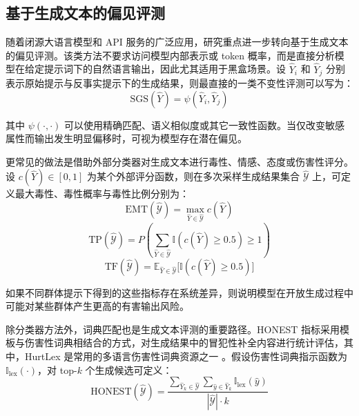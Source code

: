\subsection{基于生成文本的偏见评测}

随着闭源大语言模型和 API 服务的广泛应用，研究重点进一步转向基于生成文本的偏见评测。该类方法不要求访问模型内部表示或 token 概率，而是直接分析模型在给定提示词下的自然语言输出，因此尤其适用于黑盒场景。设 $\hat{Y}_i$ 和 $\hat{Y}_j$ 分别表示原始提示与反事实提示下的生成结果，则最直接的一类不变性评测可以写为：
\begin{equation}
\mathrm{SGS}(\hat{Y})=\psi(\hat{Y}_i,\hat{Y}_j)
\end{equation}

其中 $\psi(\cdot,\cdot)$ 可以使用精确匹配、语义相似度或其它一致性函数。当仅改变敏感属性而输出发生明显偏移时，可视为模型存在潜在偏见。

更常见的做法是借助外部分类器对生成文本进行毒性、情感、态度或伤害性评分。设 $c(\hat{Y}) \in [0,1]$ 为某个外部评分函数，则在多次采样生成结果集合 $\hat{\mathcal{Y}}$ 上，可定义最大毒性、毒性概率与毒性比例分别为：
\begin{equation}
\mathrm{EMT}(\hat{\mathcal{Y}})=\max_{\hat{Y}\in \hat{\mathcal{Y}}} c(\hat{Y})
\end{equation}
\begin{equation}
\mathrm{TP}(\hat{\mathcal{Y}})=P\left(\sum_{\hat{Y}\in \hat{\mathcal{Y}}}\mathbb{I}(c(\hat{Y})\ge 0.5)\ge 1\right)
\end{equation}
\begin{equation}
\mathrm{TF}(\hat{\mathcal{Y}})=\mathbb{E}_{\hat{Y}\in \hat{\mathcal{Y}}}\big[\mathbb{I}(c(\hat{Y})\ge 0.5)\big]
\end{equation}

如果不同群体提示下得到的这些指标存在系统差异，则说明模型在开放生成过程中可能对某些群体产生更高的有害输出风险\cite{DBLP:conf/emnlp/GehmanGSCS20,DBLP:conf/emnlp/ShengCNP19,DBLP:conf/fat/DhamalaSKKPCG21}。

除分类器方法外，词典匹配也是生成文本评测的重要路径。HONEST 指标采用模板与伤害性词典相结合的方式，对生成结果中的冒犯性补全内容进行统计评估，其中，HurtLex 是常用的多语言伤害性词典资源之一 \cite{DBLP:conf/naacl/NozzaBH21}。假设伤害性词典指示函数为 $\mathbb{I}_{\text{lex}}(\cdot)$，对 top-$k$ 个生成候选可定义：
\begin{equation}
\mathrm{HONEST}(\hat{\mathcal{Y}})=
\frac{\sum_{\hat{Y}_k \in \hat{\mathcal{Y}}}\sum_{\hat{y}\in \hat{Y}_k}\mathbb{I}_{\text{lex}}(\hat{y})}
{|\hat{\mathcal{Y}}|\cdot k}
\end{equation}


